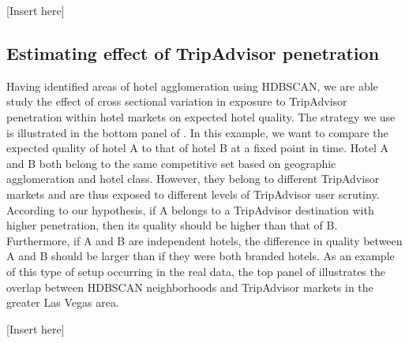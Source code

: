 \documentclass[mksc,blindrev]{informs3} %
\begin{document}
[Insert  here]

\subsection{Estimating effect of TripAdvisor penetration}

Having identified areas of hotel agglomeration using HDBSCAN, we are able study the effect of cross sectional variation in exposure to TripAdvisor penetration within hotel markets on expected hotel quality. The strategy we use is illustrated in the bottom panel of . In this example, we want to compare the expected quality of hotel A to that of hotel B at a fixed point in time. Hotel A and B both belong to the same competitive set based on geographic agglomeration and hotel class. However, they belong to different TripAdvisor markets and are thus exposed to different levels of TripAdvisor user scrutiny. According to our hypothesis, if A belongs to a TripAdvisor destination with higher penetration, then its quality should be higher than that of B. Furthermore, if A and B are independent hotels, the difference in quality between A and B should be larger than if they were both branded hotels. As an example of this type of setup occurring in the real data, the top panel of  illustrates the overlap between HDBSCAN neighborhoods and TripAdvisor markets in the greater Las Vegas area.

[Insert  here]
\end{document}
